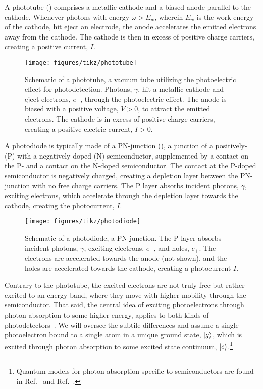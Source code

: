 A phototube () comprises a metallic cathode and a biased anode parallel to the cathode.
Whenever photons with energy $\omega>E_w$, wherein $E_w$ is the work energy of the cathode, hit eject an electrode, the anode accelerates the emitted electrons away from the cathode.
The cathode is then in excess of positive charge carriers, creating a positive current, $I$.
\begin{figure}[htb]
    \centering
    \texttt{[image: figures/tikz/phototube]}
    \caption{Schematic of a phototube, a vacuum tube utilizing the photoelectric effect for photodetection. Photons, $\gamma$, hit a metallic cathode and eject electrons, $e_-$, through the photoelectric effect. The anode is biased with a positive voltage, $V>0$, to attract the emitted electrons. The cathode is in excess of positive charge carriers, creating a positive electric current, $I>0$.}\label{fig:phototube}
\end{figure}
A photodiode is typically made of a PN-junction (), a junction of a positively- (P) with a negatively-doped (N) semiconductor, supplemented by a contact on the P- and a contact on the N-doped semiconductor.
The contact at the P-doped semiconductor is negatively charged, creating a depletion layer between the PN-junction with no free charge carriers.
The P layer absorbs incident photons, $\gamma$, exciting electrons, which accelerate through the depletion layer towards the cathode, creating the photocurrent, $I$.
\begin{figure}[htb]
    \centering
    \texttt{[image: figures/tikz/photodiode]}
    \caption{Schematic of a photodiode, a PN-junction. The P layer absorbs incident photons, $\gamma$, exciting electrons, $e_-$, and holes, $e_+$. The electrons are accelerated towards the anode (not shown), and the holes are accelerated towards the cathode, creating a photocurrent $I$.}\label{fig:photodiode}
\end{figure}
Contrary to the phototube, the excited electrons are not truly free but rather excited to an energy band, where they move with higher mobility through the semiconductor.
That said, the central idea of exciting photoelectrons through photon absorption to some higher energy, applies to both kinds of photodetectors~\cite[p.~128]{Cohen1992}.
We will oversee the subtile differences and assume a single photoelectron bound to a single atom in a unique ground state, $\lvert g\rangle$, which is excited through photon absorption to some excited state continuum, $\lvert e\rangle$.\footnote{Quantum models for photon absorption specific to semiconductors are found in Ref.~\cite{Hoyer2002} and Ref.~\cite{Rossi2002}.}

